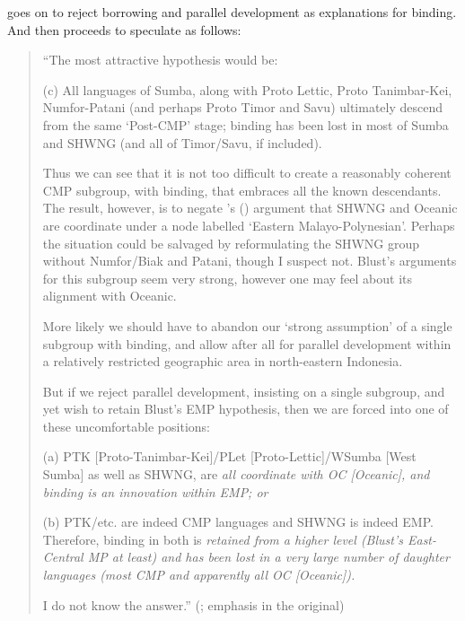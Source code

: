 \citet[253]{Mills1991} goes on to reject borrowing
and parallel development as explanations for binding.
And then proceeds to speculate as follows:

\begin{quote}
		“The most attractive hypothesis would be:
		
		(c) All languages of
		Sumba, along with Proto Lettic,
		Proto Tanimbar-Kei, Numfor-Patani (and perhaps Proto Timor
		and Savu) ultimately descend from the same ‘Post-CMP’ stage;
		binding has been lost in most of Sumba
		and SHWNG (and all of Timor/Savu, if included).

		Thus we can see that it is not too difficult to create a reasonably
		coherent CMP subgroup, with binding, that embraces all the known descendants.
		The result, however, is to negate \citeauthor{Blust1978}’s (\citeyear{Blust1978}) argument that
		SHWNG and Oceanic are coordinate under a node labelled ‘Eastern Malayo-Polynesian’.
		Perhaps the situation could be salvaged by reformulating the
		SHWNG group without Numfor/Biak
		and Patani, though I suspect not.
		Blust’s arguments for this subgroup seem very strong,
		however one may feel about its alignment with Oceanic.

		More likely we should have to abandon our ‘strong assumption’
		of a single subgroup with binding,
		and allow after all for parallel development within a relatively
		restricted geographic area in north-eastern Indonesia.

		But if we reject parallel development,
		insisting on a single subgroup,
		and yet wish to retain Blust’s EMP hypothesis,
		then we are forced into one of these uncomfortable positions:

		(a) PTK [Proto-Tanimbar-Kei]/PLet [Proto-Lettic]/WSumba [West
		Sumba] as well as SHWNG,
		are \it{all} coordinate with OC [Oceanic],
		and binding is an innovation within EMP; or
		
		(b) PTK/etc. are indeed CMP languages
		and SHWNG is indeed EMP.
		Therefore, binding in both is \it{retained} from a higher level (Blust’s
		East-Central MP at least)
		and has been lost in a very large number of daughter languages
		(most CMP and apparently all OC [Oceanic]).
		
		I do not know the answer.”
		(\citealp[253]{Mills1991}; emphasis in the original)
\end{quote}

